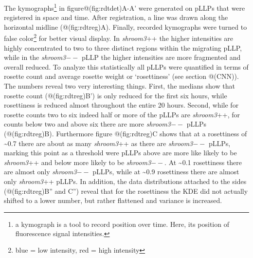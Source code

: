 \documentclass[11pt,singlespacinge,twoside]{reedthesis} %
\begin{document}
The kymographs\footnote{a kymograph is a tool to record position over time. Here, its position of fluorescence signal intensities.} in figure@(fig:rdtdet)A-A' were generated on pLLPs that were registered in space and time. After registration, a line was drawn along the horizontal midline (@(fig:rdtreg)A). Finally, recorded kymographs were turned to false color\footnote{blue = low intensity, red = high intensity} for better visual display. In \emph{shroom3}++ the higher intensities are highly concentrated to two to three distinct regions within the migrating pLLP, while in the \emph{shroom3}\(--\) pLLP the higher intensities are more fragmented and overall reduced. To analyze this statistically all pLLPs were quantified in terms of rosette count and average rosette weight or `rosettiness' (see section @(CNN)).
The numbers reveal two very interesting things. First, the medians show that rosette count (@(fig:rdtreg)B') is only reduced for the first six hours, while rosettiness is reduced almost throughout the entire 20 hours. Second, while for rosette counts two to six indeed half or more of the pLLPs are \emph{shroom3}++, for counts below two and above six there are more \emph{shroom3}\(--\) pLLPs (@(fig:rdtreg)B). Furthermore figure @(fig:rdtreg)C shows that at a rosettiness of \textasciitilde{}0.7 there are about as many \emph{shroom3}++ as there are \emph{shroom3}\(--\) pLLPs, marking this point as a threshold were pLLPs above are more like likely to be \emph{shroom3}++ and below more likely to be \emph{shroom3}\(--\). At \textasciitilde{}0.1 rosettiness there are almost only \emph{shroom3}\(--\) pLLPs, while at \textasciitilde{}0.9 rosettiness there are almost only \emph{shroom3}++ pLLPs.
In addition, the data distributions attached to the sides (@(fig:rdtreg)B'' and C'') reveal that for the rosettiness the KDE did not actually shifted to a lower number, but rather flattened and variance is increased.
\end{document}
